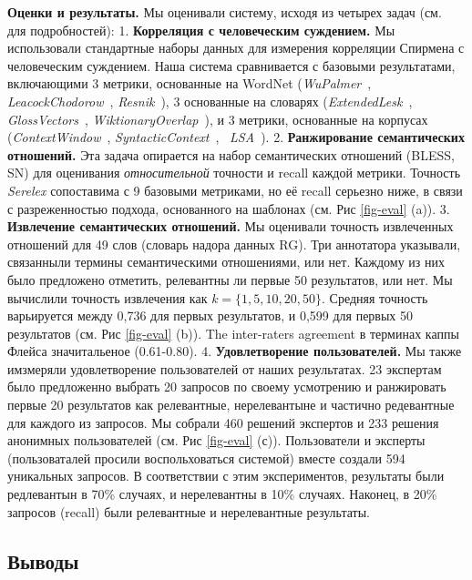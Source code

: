 \documentclass[a4paper,10pt,twoside]{article}
\begin{document}
\textbf{Оценки и результаты.}
Мы оценивали систему, исходя из четырех задач (см. ~\cite{panchenko2012konvens} для подробностей):
1. \textbf{Корреляция с человеческим суждением.} Мы использовали стандартные наборы данных для измерения корреляции Спирмена с человеческим суждением. Наша система сравнивается с базовыми результатами, включающими 3 метрики, основанные на WordNet (\textit{WuPalmer}~\cite{wu1994verbs}, \textit{LeacockChodorow}~\cite{leacock1998}, \textit{Resnik}~\cite{resnik1995}), 3 основанные на словарях (\textit{ExtendedLesk}~\cite{banerjee2003extended}, \textit{GlossVectors}~\cite{patwardhan2006using}, \textit{WiktionaryOverlap}~\cite{zesch2008extracting}), и 3 метрики, основанные на корпусах (\textit{ContextWindow}~\cite{cruys2010mining}, \textit{SyntacticContext}~\cite{cruys2010mining}, ~\textit{LSA}~\cite{landauer1998introduction}).
2. \textbf{Ранжирование семантических отношений.} Эта задача опирается на набор семантических отношений (BLESS,  SN) для оценивания \textit{относительной} точности и recall каждой метрики. Точность \textit{Serelex}  сопоставима с 9 базовыми метриками, но её recall серьезно ниже, в связи с разреженностью подхода, основанного на шаблонах (см. Рис \ref{fig-eval} (a)).
3. \textbf{Извлечение семантических отношений.} Мы оценивали точность извлеченных отношений для 49 слов (словарь надора данных RG). Три аннотатора указывали, связанныли термины семантическими отношениями, или нет. Каждому из них было предложено отметить, релевантны ли первые 50 результатов, или нет. Мы вычислили точность извлечения как $k = \{1, 5, 10, 20, 50\}$. Средняя точность варьируется между 0,736 для первых результатов, и 0,599 для первых 50 результатов (см. Рис \ref{fig-eval} (b)). The inter-raters agreement в терминах каппы Флейса значитальеное (0.61-0.80).
4. \textbf{Удовлетворение пользователей.} Мы также имзмеряли удовлетворение пользователей от наших результатах. 23 экспертам было предложенно выбрать 20 запросов по своему усмотрению и ранжировать первые 20 результатов как релевантные, нерелевантыне и частично редевантные для каждого из запросов. Мы собрали 460 решений экспертов и 233 решения анонимных пользователей (см. Рис \ref{fig-eval} (с)). Пользователи и эксперты (пользоваталей просили воспольховаться системой) вместе создали 594 уникальных запросов. В соответствии с этим экспериментов, результаты были редлевантын  в 70\% случаях, и нерелевантны в 10\% случаях. Наконец, в 20\% запросов (recall) были релевантные и нерелевантные результаты. 

\subsection{Выводы}
\end{document}
